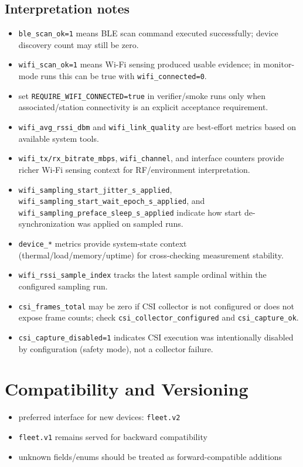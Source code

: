 \documentclass[11pt,a4paper]{article}
\begin{document}
\subsection{Interpretation notes}
\begin{itemize}
  \item \texttt{ble\_scan\_ok=1} means BLE scan command executed successfully; device discovery count may still be zero.
  \item \texttt{wifi\_scan\_ok=1} means Wi-Fi sensing produced usable evidence; in monitor-mode runs this can be true with \texttt{wifi\_connected=0}.
  \item set \texttt{REQUIRE\_WIFI\_CONNECTED=true} in verifier/smoke runs only when associated/station connectivity is an explicit acceptance requirement.
  \item \texttt{wifi\_avg\_rssi\_dbm} and \texttt{wifi\_link\_quality} are best-effort metrics based on available system tools.
  \item \texttt{wifi\_tx/rx\_bitrate\_mbps}, \texttt{wifi\_channel}, and interface counters provide richer Wi-Fi sensing context for RF/environment interpretation.
  \item \texttt{wifi\_sampling\_start\_jitter\_s\_applied}, \texttt{wifi\_sampling\_start\_wait\_epoch\_s\_applied}, and \texttt{wifi\_sampling\_preface\_sleep\_s\_applied} indicate how start de-synchronization was applied on sampled runs.
  \item \texttt{device\_*} metrics provide system-state context (thermal/load/memory/uptime) for cross-checking measurement stability.
  \item \texttt{wifi\_rssi\_sample\_index} tracks the latest sample ordinal within the configured sampling run.
  \item \texttt{csi\_frames\_total} may be zero if CSI collector is not configured or does not expose frame counts; check \texttt{csi\_collector\_configured} and \texttt{csi\_capture\_ok}.
  \item \texttt{csi\_capture\_disabled=1} indicates CSI execution was intentionally disabled by configuration (safety mode), not a collector failure.
\end{itemize}

\section{Compatibility and Versioning}
\begin{itemize}
  \item preferred interface for new devices: \texttt{fleet.v2}
  \item \texttt{fleet.v1} remains served for backward compatibility
  \item unknown fields/enums should be treated as forward-compatible additions
\end{itemize}
\end{document}

